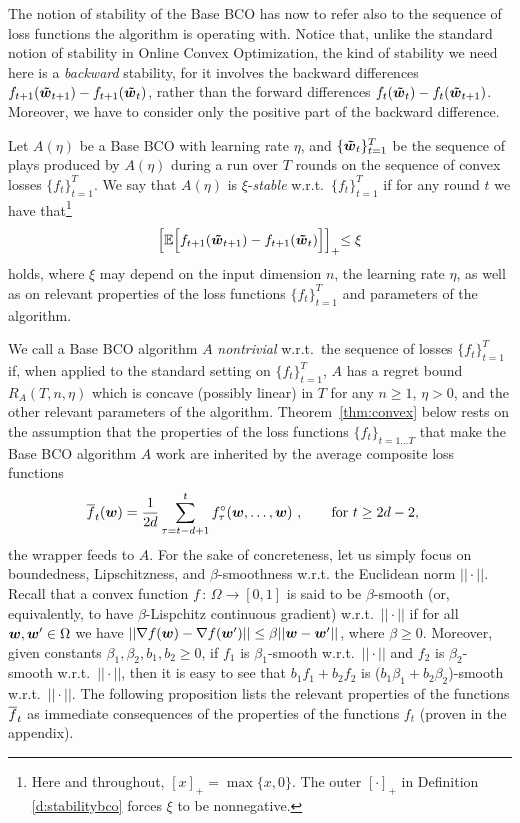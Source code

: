 %
The notion of stability of the Base BCO has now to refer also to the sequence of loss functions the algorithm is operating with. Notice that, unlike the standard notion of stability in Online Convex Optimization, the kind of stability we need here is a {\em backward} stability, for it involves the backward differences $f_{t+1}(\boldsymbol{{\tilde w}}_{t+1}) - f_{t+1}(\boldsymbol{{\tilde w}}_t)$, rather than the forward differences $f_{t}(\boldsymbol{{\tilde w}}_{t}) - f_{t}(\boldsymbol{{\tilde w}}_{t+1})$. Moreover, we have to consider only the positive part of the backward difference.
%
\begin{definition}\label{d:stabilitybco}
Let $A(\eta)$ be a Base BCO with learning rate $\eta$, and $\{\boldsymbol{{\tilde w}}_t\}_{t=1}^T$ be the sequence of plays produced by $A(\eta)$ during a run over $T$ rounds on the sequence of convex losses $\{f_t\}_{t=1}^T$. We say that $A(\eta)$ is $\xi$-{\em stable} w.r.t.\ $\{f_t\}_{t=1}^T$ if for any round $t$ we have that\footnote
{
Here and throughout, $[x]_+ = \max\{x,0\}$. The outer $[\cdot]_+$ in Definition \ref{d:stabilitybco} forces $\xi$ to be nonnegative. 
}
\[
    \Bigl[\mathbb{E}\Big[f_{t+1}(\boldsymbol{{\tilde w}}_{t+1}) -f_{t+1}(\boldsymbol{{\tilde w}}_t) \Big]\Bigl]_+ \leq \xi
\]
holds, where $\xi$ may depend on the input dimension $n$, the learning rate $\eta$, as well as on relevant properties of the loss functions $\{f_t\}_{t=1}^T$ and parameters of the algorithm.
\end{definition}
%
We call a Base BCO algorithm $A$ {\em nontrivial} w.r.t.\ the sequence of losses $\{f_t\}_{t=1}^T$ if, when applied to the standard setting on $\{f_t\}_{t=1}^T$, $A$ has a regret bound $R_A(T,n,\eta)$ which is concave (possibly linear) in $T$ for any $n \geq 1$, $\eta > 0$, and the other relevant parameters of the algorithm.
%
Theorem~\ref{thm:convex} below rests on the assumption that the properties of the loss functions $\{f_t\}_{t=1...T}$ that make the Base BCO algorithm $A$ work are inherited by the average composite loss functions
%
\begin{align*}
{\overline{f}}_t(\boldsymbol{w}) &= \frac{1}{2d}\sum_{\tau=t-d+1}^t f^{\circ}_\tau(\boldsymbol{w},\dots,\boldsymbol{w})~, \qquad {\mbox{for $t \geq 2d-2$}},
\end{align*}
%
the wrapper feeds to $A$. For the sake of concreteness, let us simply focus on boundedness, Lipschitzness, and $\beta$-smoothness w.r.t. the Euclidean norm $||\cdot||$. Recall that a convex function $f\,:\,\Omega \to [0,1]$ is said to be $\beta$-smooth (or, equivalently, to have $\beta$-Lispchitz continuous gradient) w.r.t.\ $||\cdot||$ if for all $\boldsymbol{w}, \boldsymbol{w}' \in \Omega$ we have $||\nabla f(\boldsymbol{w}) - \nabla f(\boldsymbol{w}')|| \leq \beta ||\boldsymbol{w}-\boldsymbol{w}'||$, where $\beta \geq 0$. Moreover, given constants $\beta_1,\beta_2, b_1, b_2 \geq 0$, if $f_1$ is $\beta_1$-smooth w.r.t.\ $||\cdot||$ and $f_2$ is $\beta_2$-smooth w.r.t.\ $||\cdot||$, then it is easy to see that $b_1 f_1 + b_2 f_2$ is ($b_1\beta_1+b_2\beta_2$)-smooth w.r.t.\ $||\cdot||$. The following proposition lists the relevant properties of the functions ${\overline{f}}_t$ as immediate consequences of the properties of the functions $f_t$ (proven in the appendix).

